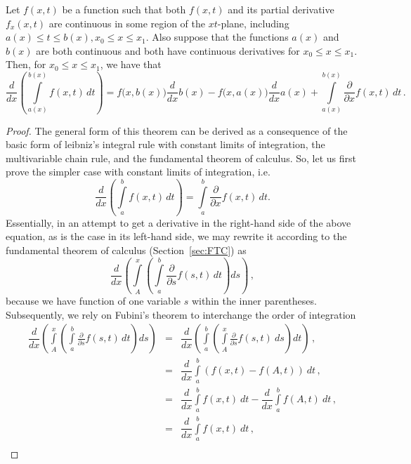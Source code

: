 \begin{theorem}
\label{thm:leibniz}
Let $f(x, t)$ be a function such that both $f(x, t)$ and its partial derivative $f_x(x, t)$ are continuous in some region of the $xt$-plane, including $a(x) \leq t\leq b(x), x_0 \leq x \leq x_1$. Also suppose that the functions $a(x)$ and $b(x)$ are both continuous and both have continuous derivatives for $x_0 \leq x \leq x_1$. Then, for $x_0 \leq x \leq x_1$, we have that
$$\displaystyle {\frac {d}{dx}}\left(\int\limits _{a(x)}^{b(x)}f(x,t)\,dt\right)=f{\big (}x,b(x){\big )} {\frac {d}{dx}}b(x)-f{\big (}x,a(x){\big )} {\frac {d}{dx}}a(x)+\int\limits _{a(x)}^{b(x)}{\frac {\partial }{\partial x}}f(x,t)\,dt\,.
$$
\end{theorem}
\begin{proof}
The general form of this theorem can be derived as a consequence of the basic form of leibniz's integral rule with constant limits of integration, the multivariable chain rule, and the fundamental theorem of calculus. So, let us first prove the simpler case with constant limits of integration, i.e.
$$
\displaystyle {\frac {d}{dx}}\left(\int\limits _{a}^{b}f(x,t)\,dt\right)=\int\limits _{a}^{b}{\frac {\partial }{\partial x}}f(x,t)\,dt.
$$
Essentially, in an attempt to get a derivative in the right-hand side of the above equation, as is the case in its left-hand side, we may rewrite it according to the fundamental theorem of calculus (Section~\ref{sec:FTC}) as
$$
\dfrac{d}{dx}\left(\int\limits_A^x \left( \int\limits _{a}^{b}{\frac {\partial }{\partial s}}f(s,t)\,dt\right) ds\right)\,,
$$
because we have function of one variable $s$ within the inner parentheses. Subsequently, we rely on Fubini's theorem to interchange the order of integration
\begin{eqnarray*}
\dfrac{d}{dx}\left(\int\limits_A^x \left( \int\limits _{a}^{b}{\frac {\partial }{\partial s}}f(s,t)\,dt\right) ds\right)&=&\dfrac{d}{dx}\left(\int\limits_a^b \left( \int\limits_{A}^{x}{\frac {\partial }{\partial s}}f(s,t)\ ds\right)dt\right)\,,\\[0.2cm]
&=&\dfrac{d}{dx}\int\limits_a^b   \left(f(x,t)-f(A,t)\right)\ dt\,,\\[0.2cm]
&=&\dfrac{d}{dx}\int\limits_a^b   f(x,t)\ dt-\dfrac{d}{dx}\int\limits_a^b   f(A,t)\ dt\,,\\[0.2cm]
&=&\dfrac{d}{dx}\int\limits_a^b  f(x,t)\ dt\,,\\[0.2cm]
\end{eqnarray*}


\end{proof}
